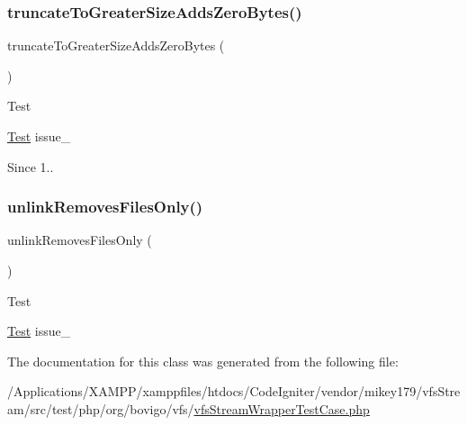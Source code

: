 \subsubsection{\texorpdfstring{truncate\+To\+Greater\+Size\+Adds\+Zero\+Bytes()}{truncateToGreaterSizeAddsZeroBytes()}}
{\footnotesize\ttfamily truncate\+To\+Greater\+Size\+Adds\+Zero\+Bytes (\begin{DoxyParamCaption}{ }\end{DoxyParamCaption})}

\begin{DoxyRefDesc}{Test}
\item[\mbox{\hyperlink{test__test000280}{Test}}]issue\+\_ \end{DoxyRefDesc}
\begin{DoxySince}{Since}
1.. 
\end{DoxySince}
\mbox{\label{classorg_1_1bovigo_1_1vfs_1_1vfs_stream_wrapper_test_case_a02621d3233219539b0267aa88ebde0eb}} 
\subsubsection{\texorpdfstring{unlink\+Removes\+Files\+Only()}{unlinkRemovesFilesOnly()}}
{\footnotesize\ttfamily unlink\+Removes\+Files\+Only (\begin{DoxyParamCaption}{ }\end{DoxyParamCaption})}

\begin{DoxyRefDesc}{Test}
\item[\mbox{\hyperlink{test__test000251}{Test}}]issue\+\_ \end{DoxyRefDesc}


The documentation for this class was generated from the following file\+:\begin{DoxyCompactItemize}
\item 
/\+Applications/\+X\+A\+M\+P\+P/xamppfiles/htdocs/\+Code\+Igniter/vendor/mikey179/vfs\+Stream/src/test/php/org/bovigo/vfs/\mbox{\hyperlink{vfs_stream_wrapper_test_case_8php}{vfs\+Stream\+Wrapper\+Test\+Case.\+php}}\end{DoxyCompactItemize}
